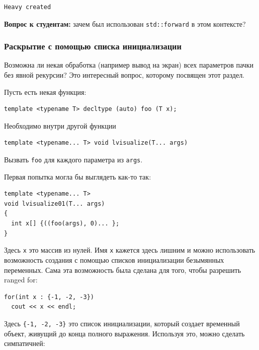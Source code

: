 \documentclass[a4paper,12pt,oneside]{article}
\newif\ifanswers
\begin{document}
\begin{verbatim}
Heavy created
\end{verbatim}

\textbf{Вопрос к студентам:} зачем был использован \lstinline!std::forward! в этом контексте?

\ifanswers
Ответ: на случай если аргументы конструктора также имеют тяжелые копирующие конструкторы. Обобщённое программирование, что уж тут.
\fi

\subsubsection{Раскрытие с помощью списка инициализации}\label{ExpandInit}

Возможна ли некая обработка (например вывод на экран) всех параметров пачки без явной рекурсии? Это интересный вопрос, которому посвящен этот раздел.

Пусть есть некая функция:

\begin{lstlisting}
template <typename T> decltype (auto) foo (T x);
\end{lstlisting}

Необходимо внутри другой функции 

\begin{lstlisting}
template <typename... T> void lvisualize(T... args)
\end{lstlisting}

Вызвать \lstinline!foo! для каждого параметра из \lstinline!args!.

Первая попытка могла бы выглядеть как-то так:

\begin{lstlisting}
template <typename... T>
void lvisualize01(T... args)
{
  int x[] {((foo(args), 0)... };
}
\end{lstlisting}

Здесь \lstinline!x! это массив из нулей. Имя \lstinline!x! кажется здесь лишним и можно использовать возможность создания с помощью списков инициализации безымянных переменных. Сама эта возможность была сделана для того, чтобы разрешить ranged for:

\begin{lstlisting}
for(int x : {-1, -2, -3})
  cout << x << endl;
\end{lstlisting}

Здесь \lstinline!{-1, -2, -3}! это список инициализации, который создает временный объект, живущий до конца полного выражения. Используя это, можно сделать симпатичней:
\end{document}
